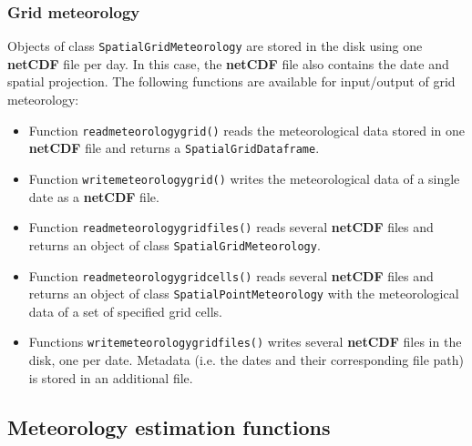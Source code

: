 \documentclass[11pt,a4paper]{article}
\begin{document}
\subsubsection{Grid meteorology}
 Objects of class \texttt{SpatialGridMeteorology} are stored in the disk using one \textbf{netCDF} file per day. In this case, the \textbf{netCDF} file also contains the date and spatial projection. The following functions are available for input/output of grid meteorology:
\begin{itemize}
\item{Function \texttt{readmeteorologygrid()} reads the meteorological data stored in one \textbf{netCDF} file and returns a \texttt{SpatialGridDataframe}.}
\item{Function \texttt{writemeteorologygrid()} writes the meteorological data of a single date as a \textbf{netCDF} file.}
\item{Function \texttt{readmeteorologygridfiles()} reads several \textbf{netCDF} files and returns an object of class \texttt{SpatialGridMeteorology}.}
\item{Function \texttt{readmeteorologygridcells()} reads several \textbf{netCDF} files and returns an object of class \texttt{SpatialPointMeteorology} with the meteorological data of a set of specified grid cells.}
\item{Functions \texttt{writemeteorologygridfiles()} writes several \textbf{netCDF} files in the disk, one per date. Metadata (i.e. the dates and their corresponding file path) is stored in an additional file.}
\end{itemize}

\subsection{Meteorology estimation functions}
\end{document}
